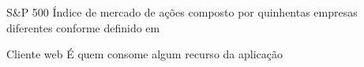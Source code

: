 \begin{siglas}
    \item[S\&P 500] Índice de mercado de ações composto por
                    quinhentas empresas diferentes conforme definido
                    em 

    \item[Cliente web] É quem consome algum recurso da aplicação
\end{siglas}
